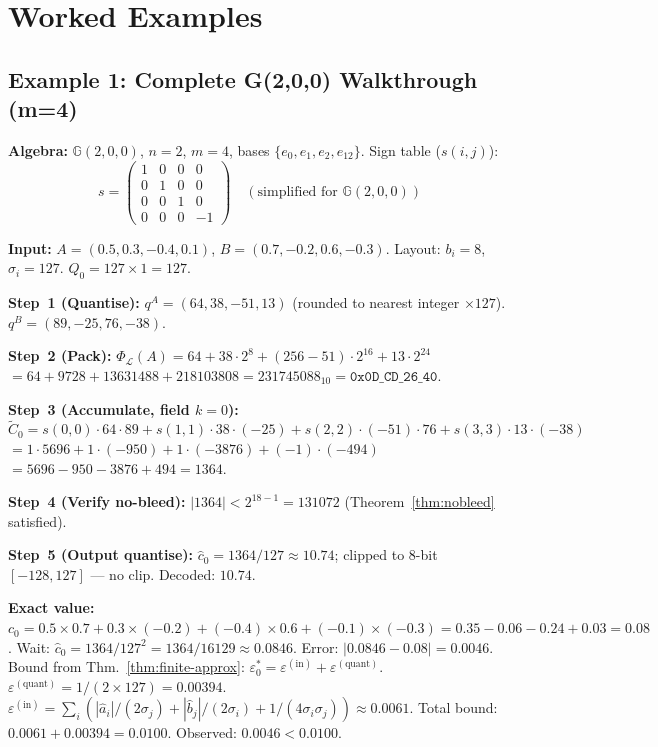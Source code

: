 \documentclass[11pt,a4paper]{article}
\theoremstyle{definition}
\theoremstyle{plain}
\theoremstyle{remark}
\newcommand{\GA}{\mathbb{G}}
\newcommand{\Pack}{\Phi_{\mathcal{L}}}
\begin{document}
\section{Worked Examples}
\label{sec:examples}

\subsection{Example 1: Complete G(2,0,0) Walkthrough (m=4)}

\textbf{Algebra:} $\GA(2,0,0)$, $n=2$, $m=4$, bases $\{e_0,e_1,e_2,e_{12}\}$.
Sign table ($s(i,j)$):
\[
  s = \begin{pmatrix}
    1 & 0 & 0 & 0\\
    0 & 1 & 0 & 0\\
    0 & 0 & 1 & 0\\
    0 & 0 & 0 & -1
  \end{pmatrix} \quad (\text{simplified for } \GA(2,0,0))
\]

\textbf{Input:} $A=(0.5, 0.3, -0.4, 0.1)$, $B=(0.7, -0.2, 0.6, -0.3)$.
Layout: $b_i=8$, $\sigma_i=127$. $Q_0=127\times 1=127$.

\textbf{Step~1 (Quantise):}
$q^A=(64, 38, -51, 13)$ (rounded to nearest integer $\times 127$).
$q^B=(89, -25, 76, -38)$.

\textbf{Step~2 (Pack):}
$\Pack(A) = 64 + 38\cdot 2^8 + (256-51)\cdot 2^{16} + 13\cdot 2^{24}$
$= 64 + 9728 + 13631488 + 218103808 = 231745088_{10} = \texttt{0x0D\_CD\_26\_40}$.

\textbf{Step~3 (Accumulate, field $k=0$):}
$\tilde{C}_0 = s(0,0)\cdot 64\cdot 89 + s(1,1)\cdot 38\cdot(-25)
              + s(2,2)\cdot(-51)\cdot 76 + s(3,3)\cdot 13\cdot(-38)$
$= 1\cdot5696 + 1\cdot(-950) + 1\cdot(-3876) + (-1)\cdot(-494)$
$= 5696 - 950 - 3876 + 494 = 1364$.

\textbf{Step~4 (Verify no-bleed):}
$|1364| < 2^{18-1}=131072$ \checkmark\quad (Theorem~\ref{thm:nobleed} satisfied).

\textbf{Step~5 (Output quantise):}
$\hat{c}_0 = 1364/127 \approx 10.74$; clipped to 8-bit $[-128,127]$ --- no clip.
Decoded: $10.74$.

\textbf{Exact value:} $c_0 = 0.5\times 0.7 + 0.3\times(-0.2) + (-0.4)\times 0.6 + (-0.1)\times(-0.3) = 0.35-0.06-0.24+0.03 = 0.08$.
Wait: $\hat{c}_0 = 1364/127^2 = 1364/16129 \approx 0.0846$.
Error: $|0.0846-0.08|=0.0046$.
Bound from Thm.~\ref{thm:finite-approx}: $\varepsilon_0^* = \varepsilon^{(\mathrm{in})}+\varepsilon^{(\mathrm{quant})}$.
$\varepsilon^{(\mathrm{quant})} = 1/(2\times 127) = 0.00394$.
$\varepsilon^{(\mathrm{in})} = \sum_i(|\hat{a}_i|/(2\sigma_{j})
  +|\hat{b}_{j}|/(2\sigma_i)+1/(4\sigma_i\sigma_{j})) \approx 0.0061$.
Total bound: $0.0061+0.00394=0.0100$.
Observed: $0.0046 < 0.0100$. \checkmark
\end{document}
